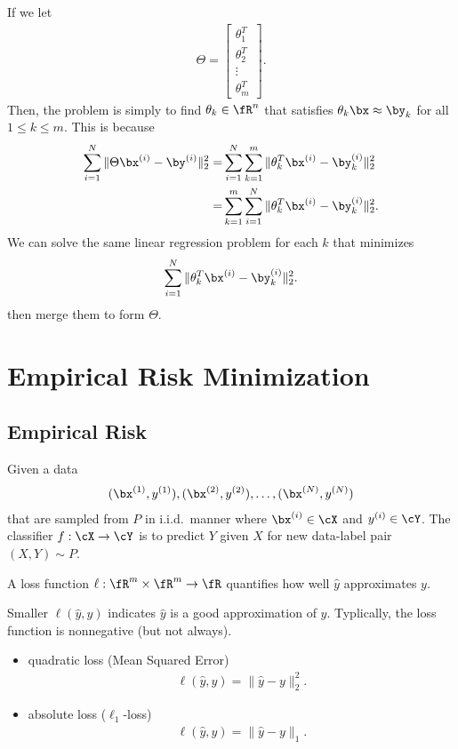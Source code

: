 \documentclass{article}
\begin{document}
If we let
\begin{align}
    \Theta = \begin{bmatrix} \theta_1^T \\ \theta_2^T\\ \vdots \\ \theta_m^T\end{bmatrix}.
\end{align}
Then, the problem is simply to find $\theta_k\in\fR^n$ that satisfies $\theta_k \bx \approx \by_k$ for all $1\leq k \leq m$.
This is because
\begin{align}
    \sum_{i=1}^N \|\Theta \bx^{(i)} - \by^{(i)}\|_2^2 
    =&  \sum_{i=1}^N \sum_{k=1}^m\|\theta_k^T \bx^{(i)} - \by^{(i)}_k\|_2^2\\
    =&  \sum_{k=1}^m\sum_{i=1}^N \|\theta_k^T \bx^{(i)} - \by^{(i)}_k\|_2^2.
\end{align}
We can solve the same linear regression problem for each $k$ that minimizes
\begin{align}
    \sum_{i=1}^N \|\theta_k^T \bx^{(i)} - \by^{(i)}_k\|_2^2.
\end{align}
then merge them to form $\Theta$.


\section{Empirical Risk Minimization} \label{sec:ERM}
\subsection{Empirical Risk} \label{subsec:ER}
Given a data
\begin{align}
    (\bx^{(1)}, y^{(1)}), (\bx^{(2)}, y^{(2)}), \dots,  (\bx^{(N)}, y^{(N)})
\end{align}
that are sampled from $P$ in i.i.d.~manner where $\bx^{(i)}\in\cX$ and $y^{(i)}\in\cY$.
The classifier $f:\cX\rightarrow \cY$ is to predict $Y$ given $X$ for new data-label pair $(X, Y)\sim P$.


\begin{definition}
    A loss function $\ell:\fR^m\times \fR^m \rightarrow \fR$ quantifies how well $\hat{y}$ approximates $y$.
\end{definition}
Smaller $\ell(\hat{y}, y)$ indicates $\hat{y}$ is a good approximation of $y$.
Typlically, the loss function is nonnegative (but not always).

\begin{example}
    \begin{itemize}
        \item quadratic loss (Mean Squared Error)
        \begin{align}
            \ell(\hat{y}, y) = \|\hat{y} - y\|_2^2.
        \end{align}
        \item absolute loss ($\ell_1$-loss)
        \begin{align}
            \ell(\hat{y}, y) = \|\hat{y} - y\|_1.
        \end{align}
    \end{itemize}
\end{example}
\end{document}
